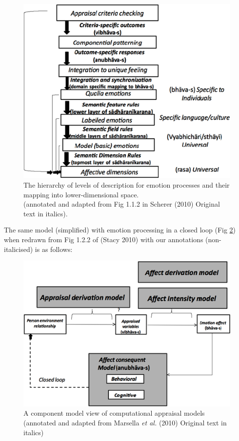 \begin{figure}[H]
\centering
\includegraphics[scale=.9]{figures/3.eps}
\caption{The hierarchy of levels of description for emotion processes and their mapping into lower-dimensional space.\\
(annotated and adapted from Fig 1.1.2 in Scherer (2010) Original text in italics).}\label{chap3-fig1}
\end{figure}

The same model (simplified) with emotion processing in a closed loop (Fig \ref{chap3-fig2}) when redrawn from Fig 1.2.2 of (Stacy 2010) with our annotations (non-italicised) is as follows:

\begin{figure}[H]
\centering
\includegraphics[scale=.9]{figures/4.eps}
\caption{A component model view of computational appraisal models (annotated and adapted from Marsella \textsl{et al.} (2010) Original text in italics)}\label{chap3-fig2}
\end{figure}

